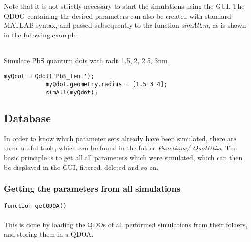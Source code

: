 	Note that it is not strictly necessary to start the simulations using the GUI. The QDOG containing the desired parameters can also be created with 
	standard MATLAB syntax, and passed subsequently to the function \textit{simAll.m}, as is shown in the following example.\\
	\\
	\begin{EXAMPLE} Simulate PbS  quantum dots with radii 1.5, 2, 2.5, 3nm. 
		\begin{lstlisting}[frame = none]
			myQdot = Qdot('PbS_lent');
			myQdot.geometry.radius = [1.5 3 4]; 
			simAll(myQdot);\end{lstlisting}
	\end{EXAMPLE}
	
	
\subsection{Database}
	In order to know which parameter sets already have been simulated, there are some useful tools, which can be found in the folder \textit{Functions/
	QdotUtils}. The basic principle is to get all all parameters which were simulated, which can then be displayed in the GUI, filtered, deleted and so on.
	
	\subsubsection{Getting the parameters from all simulations}
		\lstinline{function getQDOA()}\\\\
		This is done by loading the QDOs of all performed simulations from their folders, and storing them in a QDOA. 

